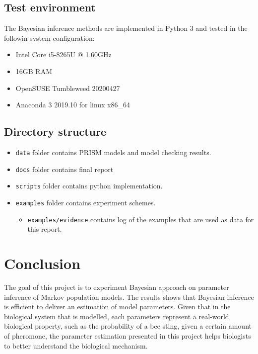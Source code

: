 \documentclass[12pt]{article}
\theoremstyle{definition}
\begin{document}
\subsection{Test environment}
The Bayesian inference methods are implemented in Python 3 and tested in the
followin system configuration:
\begin{itemize}
\item Intel Core i5-8265U @ 1.60GHz
\item 16GB RAM
\item OpenSUSE Tumbleweed 20200427
\item Anaconda 3 2019.10 for linux x86\_64
\end{itemize}

\subsection{Directory structure}
\begin{itemize}
\item \texttt{data} folder contains PRISM models and model checking results.
\item \texttt{docs} folder contains final report
\item \texttt{scripts} folder contains python implementation.
\item \texttt{examples} folder contains experiment schemes.
  \begin{itemize}
  \item \texttt{examples/evidence} contains log of the examples that are used as
    data for this report.
  \end{itemize}
\end{itemize}


\section{Conclusion}
The goal of this project is to experiment Bayesian approach on parameter
inference of Markov population models. The results shows that Bayesian inference
is efficient to deliver an estimation of model parameters. Given that in the
biological system that is modelled, each parameters represent a real-world
biological property, such as the probability of a bee sting, given a certain
amount of pheromone, the parameter estimation presented in this project helps
biologists to better understand the biological mechanism.\\
\end{document}
